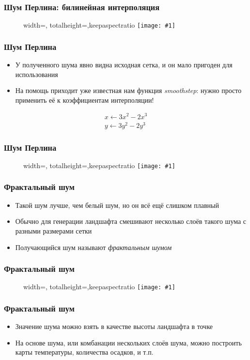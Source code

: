 \documentclass[10pt]{beamer}
\newcommand{\slideimage}[1]{
  \begin{figure}
    \begin{adjustbox}{width=\textwidth, totalheight=\textheight-2\baselineskip-2\baselineskip,keepaspectratio}
      \texttt{[image: \#1]}
    \end{adjustbox}
  \end{figure}
}
\begin{document}
\begin{frame}
\frametitle{Шум Перлина: билинейная интерполяция}
\slideimage{perlin-noise-lerp.png}
\end{frame}

\begin{frame}
\frametitle{Шум Перлина}
\begin{itemize}
\item У полученного шума явно видна исходная сетка, и он мало пригоден для использования
\pause
\item На помощь приходит уже известная нам функция \textit{smoothstep}: нужно просто применить её к коэффициентам интерполяции!
\end{itemize}
\pause
\begin{gather*}
x \leftarrow 3x^2 - 2x^3 \\
y \leftarrow 3y^2 - 2y^3
\end{gather*}
\end{frame}

\begin{frame}
\frametitle{Шум Перлина}
\slideimage{perlin-noise.png}
\end{frame}

\begin{frame}
\frametitle{Фрактальный шум}
\begin{itemize}
\item Такой шум лучше, чем белый шум, но он всё ещё слишком плавный
\pause
\item Обычно для генерации ландшафта смешивают несколько слоёв такого шума с разными размерами сетки
\pause
\item Получающийся шум называют \textit{фрактальным шумом}
\end{itemize}
\end{frame}

\begin{frame}
\frametitle{Фрактальный шум}
\slideimage{fractal-noise.png}
\end{frame}

\begin{frame}
\frametitle{Фрактальный шум}
\begin{itemize}
\item Значение шума можно взять в качестве высоты ландшафта в точке
\pause
\item На основе шума, или комбанации нескольких слоёв шума, можно построить карты температуры, количества осадков, и т.п.
\end{itemize}
\end{frame}
\end{document}
